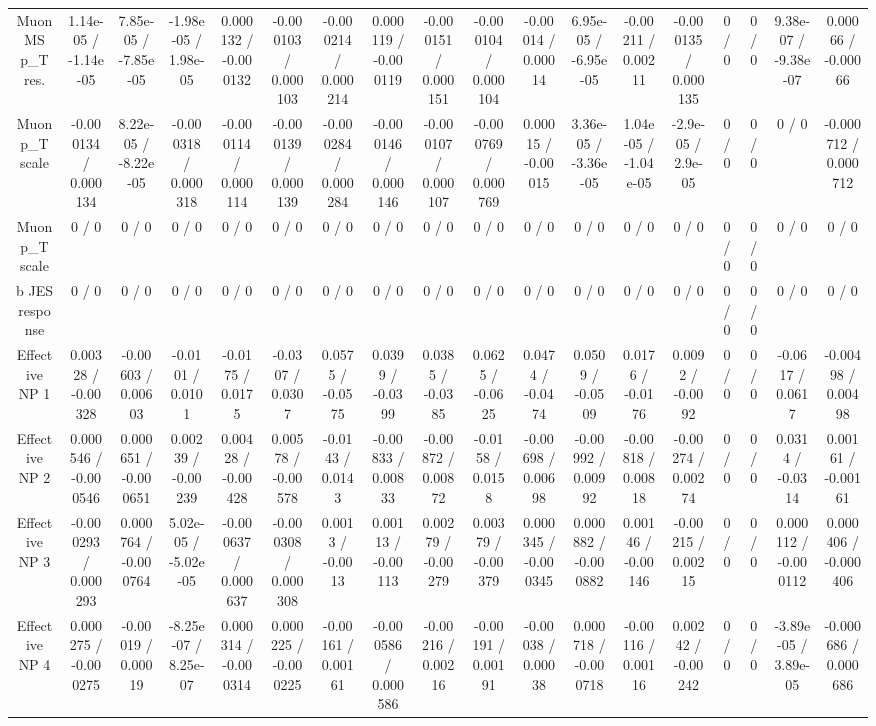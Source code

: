 \documentclass[10pt]{article}
\begin{document}
\begin{table}[htbp]
\begin{center}
\begin{tabular}{|c|c|c|c|c|c|c|c|c|c|c|c|c|c|c|c|c|c|}
  Muon MS p_{T} res. & 1.14e-05 / -1.14e-05 & 7.85e-05 / -7.85e-05 & -1.98e-05 / 1.98e-05 & 0.000132 / -0.000132 & -0.000103 / 0.000103 & -0.000214 / 0.000214 & 0.000119 / -0.000119 & -0.000151 / 0.000151 & -0.000104 / 0.000104 & -0.00014 / 0.00014 & 6.95e-05 / -6.95e-05 & -0.00211 / 0.00211 & -0.000135 / 0.000135 & 0 / 0 & 0 / 0 & 9.38e-07 / -9.38e-07 & 0.00066 / -0.00066 \\ 
  Muon p_{T} scale & -0.000134 / 0.000134 & 8.22e-05 / -8.22e-05 & -0.000318 / 0.000318 & -0.000114 / 0.000114 & -0.000139 / 0.000139 & -0.000284 / 0.000284 & -0.000146 / 0.000146 & -0.000107 / 0.000107 & -0.000769 / 0.000769 & 0.00015 / -0.00015 & 3.36e-05 / -3.36e-05 & 1.04e-05 / -1.04e-05 & -2.9e-05 / 2.9e-05 & 0 / 0 & 0 / 0 & 0 / 0 & -0.000712 / 0.000712 \\ 
  Muon p_{T} scale & 0 / 0 & 0 / 0 & 0 / 0 & 0 / 0 & 0 / 0 & 0 / 0 & 0 / 0 & 0 / 0 & 0 / 0 & 0 / 0 & 0 / 0 & 0 / 0 & 0 / 0 & 0 / 0 & 0 / 0 & 0 / 0 & 0 / 0 \\ 
  b JES response & 0 / 0 & 0 / 0 & 0 / 0 & 0 / 0 & 0 / 0 & 0 / 0 & 0 / 0 & 0 / 0 & 0 / 0 & 0 / 0 & 0 / 0 & 0 / 0 & 0 / 0 & 0 / 0 & 0 / 0 & 0 / 0 & 0 / 0 \\ 
  Effective NP 1 & 0.00328 / -0.00328 & -0.00603 / 0.00603 & -0.0101 / 0.0101 & -0.0175 / 0.0175 & -0.0307 / 0.0307 & 0.0575 / -0.0575 & 0.0399 / -0.0399 & 0.0385 / -0.0385 & 0.0625 / -0.0625 & 0.0474 / -0.0474 & 0.0509 / -0.0509 & 0.0176 / -0.0176 & 0.0092 / -0.0092 & 0 / 0 & 0 / 0 & -0.0617 / 0.0617 & -0.00498 / 0.00498 \\ 
  Effective NP 2 & 0.000546 / -0.000546 & 0.000651 / -0.000651 & 0.00239 / -0.00239 & 0.00428 / -0.00428 & 0.00578 / -0.00578 & -0.0143 / 0.0143 & -0.00833 / 0.00833 & -0.00872 / 0.00872 & -0.0158 / 0.0158 & -0.00698 / 0.00698 & -0.00992 / 0.00992 & -0.00818 / 0.00818 & -0.00274 / 0.00274 & 0 / 0 & 0 / 0 & 0.0314 / -0.0314 & 0.00161 / -0.00161 \\ 
  Effective NP 3 & -0.000293 / 0.000293 & 0.000764 / -0.000764 & 5.02e-05 / -5.02e-05 & -0.000637 / 0.000637 & -0.000308 / 0.000308 & 0.0013 / -0.0013 & 0.00113 / -0.00113 & 0.00279 / -0.00279 & 0.00379 / -0.00379 & 0.000345 / -0.000345 & 0.000882 / -0.000882 & 0.00146 / -0.00146 & -0.00215 / 0.00215 & 0 / 0 & 0 / 0 & 0.000112 / -0.000112 & 0.000406 / -0.000406 \\ 
  Effective NP 4 & 0.000275 / -0.000275 & -0.00019 / 0.00019 & -8.25e-07 / 8.25e-07 & 0.000314 / -0.000314 & 0.000225 / -0.000225 & -0.00161 / 0.00161 & -0.000586 / 0.000586 & -0.00216 / 0.00216 & -0.00191 / 0.00191 & -0.00038 / 0.00038 & 0.000718 / -0.000718 & -0.00116 / 0.00116 & 0.00242 / -0.00242 & 0 / 0 & 0 / 0 & -3.89e-05 / 3.89e-05 & -0.000686 / 0.000686 \\ 

\end{tabular}
\end{center}
\end{table}
\end{document}
